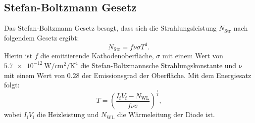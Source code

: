 \subsection{Stefan-Boltzmann Gesetz}
Das Stefan-Boltzmann Gesetz besagt, dass sich die Strahlungsleistung $N_\text{Str}$ nach folgendem Gesetz ergibt:
\begin{equation}
	N_\text{Str} = f \nu \sigma T^4\text{.} \label{eq:Strahlungsleistung}
\end{equation}
Hierin ist $f$ die emittierende Kathodenoberfläche, $\sigma$ mit einem Wert von $\SI{5.7e-12}{\watt\per\centi\meter\squared\per\kelvin\tothe{4}}$ die Stefan-Boltzmannsche Strahlungskonstante und $\nu$ mit einem Wert von $\num{0.28}$ der Emissionsgrad der Oberfläche. Mit dem Energiesatz folgt:
\begin{equation}
	T = \left(\frac{I_\text{f} V_\text{f} -N_\text{WL}}{f \nu \sigma}\right)^\frac{1}{4}\text{,} \label{eq:TausLeistung}
\end{equation}
wobei $I_\text{f} V_\text{f}$ die Heizleistung und $N_\text{WL}$ die Wärmeleitung der Diode ist.


